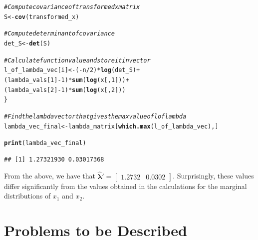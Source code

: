 \documentclass[12pt]{article}\usepackage[]{graphicx}\usepackage[]{color}
\makeatletter
\newcommand{\hlnum}[1]{\textcolor[rgb]{0.686,0.059,0.569}{#1}}%
\newcommand{\hlcom}[1]{\textcolor[rgb]{0.678,0.584,0.686}{\textit{#1}}}%
\newcommand{\hlopt}[1]{\textcolor[rgb]{0,0,0}{#1}}%
\newcommand{\hlstd}[1]{\textcolor[rgb]{0.345,0.345,0.345}{#1}}%
\newcommand{\hlkwb}[1]{\textcolor[rgb]{0.69,0.353,0.396}{#1}}%
\newcommand{\hlkwd}[1]{\textcolor[rgb]{0.737,0.353,0.396}{\textbf{#1}}}%
\newenvironment{kframe}{%
 \def\at@end@of@kframe{}%
 \ifinner\ifhmode%
  \def\at@end@of@kframe{\end{minipage}}%
  \begin{minipage}{\columnwidth}%
 \fi\fi%
 \def\FrameCommand##1{\hskip\@totalleftmargin \hskip-\fboxsep
 \colorbox{shadecolor}{##1}\hskip-\fboxsep
     \hskip-\linewidth \hskip-\@totalleftmargin \hskip\columnwidth}%
 \MakeFramed {\advance\hsize-\width
   \@totalleftmargin\z@ \linewidth\hsize
   \@setminipage}}%
 {\par\unskip\endMakeFramed%
 \at@end@of@kframe}
\newenvironment{knitrout}{}{} %
\newenvironment{problem}[2][Problem]{\begin{trivlist}
\item[\hskip \labelsep {\bfseries #1}\hskip \labelsep {\bfseries #2.}]}{\end{trivlist}}
\newcommand{\vct}{\mathbf}
\makeatother
\begin{document}
\begin{enumerate}[a)]
\begin{knitrout}
\begin{kframe}
\begin{alltt}
  \hlcom{#Compute covariance of transformed x matrix}
  \hlstd{S} \hlkwb{<-} \hlkwd{cov}\hlstd{(transformed_x)}

  \hlcom{#Compute determinant of covariance}
  \hlstd{det_S} \hlkwb{<-} \hlkwd{det}\hlstd{(S)}

  \hlcom{#Calculate function value and store it in vector}
  \hlstd{l_of_lambda_vec[i]} \hlkwb{<-} \hlstd{(}\hlopt{-}\hlstd{n}\hlopt{/}\hlnum{2}\hlstd{)} \hlopt{*} \hlkwd{log}\hlstd{(det_S)} \hlopt{+}
    \hlstd{(lambda_vals[}\hlnum{1}\hlstd{]} \hlopt{-} \hlnum{1}\hlstd{)} \hlopt{*} \hlkwd{sum}\hlstd{(}\hlkwd{log}\hlstd{(x[,}\hlnum{1}\hlstd{]))} \hlopt{+}
    \hlstd{(lambda_vals[}\hlnum{2}\hlstd{]} \hlopt{-} \hlnum{1}\hlstd{)} \hlopt{*} \hlkwd{sum}\hlstd{(}\hlkwd{log}\hlstd{(x[,}\hlnum{2}\hlstd{]))}
\hlstd{\}}

\hlcom{#Find the lambda vector that gives the max value of l of lambda}
\hlstd{lambda_vec_final} \hlkwb{<-} \hlstd{lambda_matrix[}\hlkwd{which.max}\hlstd{(l_of_lambda_vec),]}

\hlkwd{print}\hlstd{(lambda_vec_final)}
\end{alltt}
\begin{verbatim}
## [1] 1.27321930 0.03017368
\end{verbatim}
\end{kframe}
\end{knitrout}

From the above, we have that $\vct{\hat{\lambda}'} = \begin{bmatrix} 1.2732 & 0.0302 \end{bmatrix}$. Surprisingly, these values differ significantly from the values obtained in the calculations for the marginal distributions of $x_1$ and $x_2$.

\end{enumerate}


\section{Problems to be Described}

\begin{problem}{4.28}
\end{problem}
\end{document}
